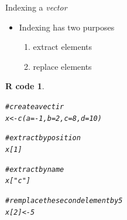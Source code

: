 \documentclass[11pt]{beamer}\usepackage[]{graphicx}\usepackage[]{color}
\makeatletter
\newcommand{\hlnum}[1]{\textcolor[rgb]{0.063,0.58,0.627}{#1}}%
\newcommand{\hlstr}[1]{\textcolor[rgb]{0.063,0.58,0.627}{#1}}%
\newcommand{\hlcom}[1]{\textcolor[rgb]{0.588,0.588,0.588}{#1}}%
\newcommand{\hlopt}[1]{\textcolor[rgb]{0.196,0.196,0.196}{#1}}%
\newcommand{\hlstd}[1]{\textcolor[rgb]{0.196,0.196,0.196}{#1}}%
\newcommand{\hlkwb}[1]{\textcolor[rgb]{0.627,0,0.314}{#1}}%
\newcommand{\hlkwc}[1]{\textcolor[rgb]{0,0.631,0.314}{#1}}%
\newcommand{\hlkwd}[1]{\textcolor[rgb]{0.78,0.227,0.412}{#1}}%
\newenvironment{kframe}{%
 \def\at@end@of@kframe{}%
 \ifinner\ifhmode%
  \def\at@end@of@kframe{\end{minipage}}%
  \begin{minipage}{\columnwidth}%
 \fi\fi%
 \def\FrameCommand##1{\hskip\@totalleftmargin \hskip-\fboxsep
 \colorbox{shadecolor}{##1}\hskip-\fboxsep
     \hskip-\linewidth \hskip-\@totalleftmargin \hskip\columnwidth}%
 \MakeFramed {\advance\hsize-\width
   \@totalleftmargin\z@ \linewidth\hsize
   \@setminipage}}%
 {\par\unskip\endMakeFramed%
 \at@end@of@kframe}
\newenvironment{knitrout}{}{} %
\newtheorem{rcode}{R code}[section]
\makeatother
\begin{document}
\begin{frame}[fragile]{Indexing a \textit{vector}}
\begin{itemize}
  \setlength\itemsep{2em}
\item Indexing has two purposes
\pause \begin{enumerate}
\normalsize
\item extract elements 
\item replace elements
\end{enumerate}
\end{itemize}
\pause 
\begin{knitrout}
\color{fgcolor}\begin{kframe}
\begin{rcode}\label{unnamed-chunk-25}\begin{alltt}
\hlcom{# create a vectir}
\hlstd{x} \hlkwb{<-} \hlkwd{c}\hlstd{(}\hlkwc{a} \hlstd{=} \hlopt{-}\hlnum{1}\hlstd{,} \hlkwc{b} \hlstd{=} \hlnum{2}\hlstd{,} \hlkwc{c} \hlstd{=} \hlnum{8}\hlstd{,} \hlkwc{d} \hlstd{=} \hlnum{10}\hlstd{)}

\hlcom{# extract by position}
\hlstd{x[}\hlnum{1}\hlstd{]}

\hlcom{# extract by name}
\hlstd{x[}\hlstr{"c"}\hlstd{]}

\hlcom{# remplace the second element by 5}
\hlstd{x[}\hlnum{2}\hlstd{]} \hlkwb{<-} \hlnum{5}
\end{alltt}
\end{rcode}\end{kframe}
\end{knitrout}
\end{frame}
\end{document}
